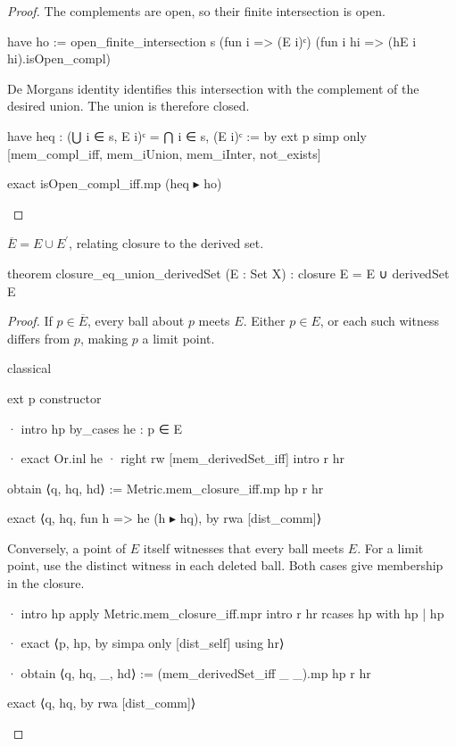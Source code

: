 \begin{proof}
  The complements are open, so their finite intersection is open.

  \begin{lean}
    have ho := open_finite_intersection s (fun i => (E i)ᶜ)
      (fun i hi => (hE i hi).isOpen_compl)
  \end{lean}

  De Morgan\textquotesingle s identity identifies this intersection with the complement of the
  desired union.
  The union is therefore closed.

  \begin{lean}
    have heq : (⋃ i ∈ s, E i)ᶜ = ⋂ i ∈ s, (E i)ᶜ := by
      ext p
      simp only [mem_compl_iff, mem_iUnion, mem_iInter, not_exists]

    exact isOpen_compl_iff.mp (heq ▸ ho)
  \end{lean}
\end{proof}

\begin{lemma}
  \label{ma:lem:closure-eq-union-limitPoints}
  $\overline E=E\cup E^{\prime}$, relating closure to the derived set.

  \begin{lean}
    theorem closure_eq_union_derivedSet (E : Set X) :
        closure E = E ∪ derivedSet E
  \end{lean}
\end{lemma}

\begin{proof}
  If $p\in\overline E$, every ball about $p$ meets $E$.
  Either $p\in E$, or each such witness differs from $p$, making $p$ a limit point.

  \begin{lean}
    classical

    ext p
    constructor

    · intro hp
      by_cases he : p ∈ E

      · exact Or.inl he
      · right
        rw [mem_derivedSet_iff]
        intro r hr

        obtain ⟨q, hq, hd⟩ := Metric.mem_closure_iff.mp hp r hr

        exact ⟨q, hq, fun h => he (h ▸ hq), by rwa [dist_comm]⟩
  \end{lean}

  Conversely, a point of $E$ itself witnesses that every ball meets $E$.
  For a limit point, use the distinct witness in each deleted ball.
  Both cases give membership in the closure.

  \begin{lean}
    · intro hp
      apply Metric.mem_closure_iff.mpr
      intro r hr
      rcases hp with hp | hp

      · exact ⟨p, hp, by simpa only [dist_self] using hr⟩

      · obtain ⟨q, hq, _, hd⟩ := (mem_derivedSet_iff _ _).mp hp r hr

        exact ⟨q, hq, by rwa [dist_comm]⟩
  \end{lean}

\end{proof}

